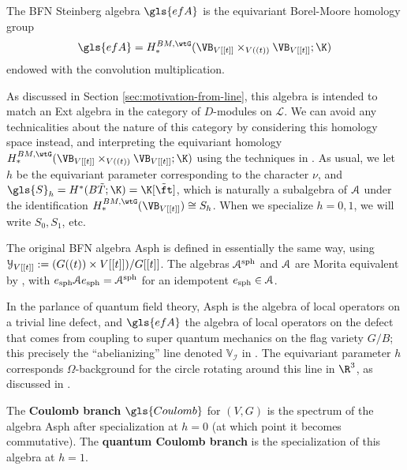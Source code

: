 \begin{definition} The BFN Steinberg algebra $\gls{efA}$ is the equivariant Borel-Moore homology group
   \[\gls{efA}=H_*^{BM, \wtG}(\VB_{V[[t]]}\times_{V((t))}\VB_{V[[t]]};\K)\] endowed with the convolution multiplication.  
 \end{definition}
 As discussed in Section \ref{sec:motivation-from-line}, this algebra
is intended to match an Ext algebra in the category of $D$-modules on
$\mathcal{L}$.  We can avoid any technicalities about the nature of
this category by considering this
homology space instead, and interpreting the equivariant homology $H_*^{BM,
  \wtG}(\VB_{V[[t]]}\times_{V((t))}\VB_{V[[t]]};\K)$ using the techniques in \cite[\S 2(ii)]{BFN}. 
  As usual, we let $h$ be
the equivariant parameter corresponding to the character $\nu$, and $\gls{S}_h=H^*(B\tilde{T};\K)=\K[\tilde{\ft}]$, which is naturally a subalgebra of $\EuScript{A}$ under the identification $H^{BM,\wtG}_*(\VB_{V[[t]]})\cong S_h$.  When we specialize $h=0,1$, we will write $S_0,S_1$, etc.


The original BFN algebra \gls{Asph} is
defined in essentially the same way, using
$\EuScript{Y}_{V[[t]]}:=(G((t)) \times V[[t]])/G[[t]]$.  The algebras $\EuScript{A}^{\operatorname{sph}}$ and $\EuScript{A}$
  are Morita equivalent by \cite[Lemma 3.3]{WebSD}, with
  $e_{\operatorname{sph}}
  \EuScript{A}e_{\operatorname{sph}}=\EuScript{A}^{\operatorname{sph}}$
  for an idempotent $e_{\operatorname{sph}}\in \EuScript{A}$.
  \begin{physics}
    In the parlance of quantum field theory, \gls{Asph} is the algebra
    of local operators on a trivial line defect, and $\gls{efA}$ the
    algebra of local operators on the defect that comes from coupling
    to super quantum mechanics on the flag variety $G/B$; this
    precisely the ``abelianizing'' line denoted $\mathbb{V}_{\mathcal{I}}$ in \cite[\S 7]{DGGH}.  The
    equivariant parameter $h$ corresponds $\Omega$-background for the circle rotating
    around this line in $\R^3$, as discussed in \cite[\S 6]{BBBDN}.
  \end{physics}


  
  
\begin{definition}
The {\bf Coulomb branch} $\gls{Coulomb}$ for $(V,G)$ is the spectrum of the algebra \gls{Asph} after specialization at $h=0$ (at which point it becomes commutative).  The {\bf quantum Coulomb branch} is the specialization of this algebra at $h=1$.
\end{definition}

